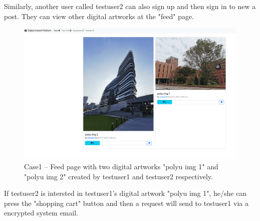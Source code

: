 Similarly, another user called testuser2 can also sign up and then sign in to new a post. They can view other digital artworks at the "feed" page. 

\begin{figure}[!h]
    \centering
    \includegraphics[width=0.9\linewidth]{figures/case1-5.png}
    \caption{Case1 -- Feed page with two digital artworks "polyu img 1" and "polyu img 2" created by testuser1 and testuser2 respectively.}
    \label{fig: case1-5}
\end{figure}

If testuser2 is intersted in testuser1's digital artwork "polyu img 1", he/she can press the "shopping cart" button and then a request will send to testuser1 via a encrypted system email.

